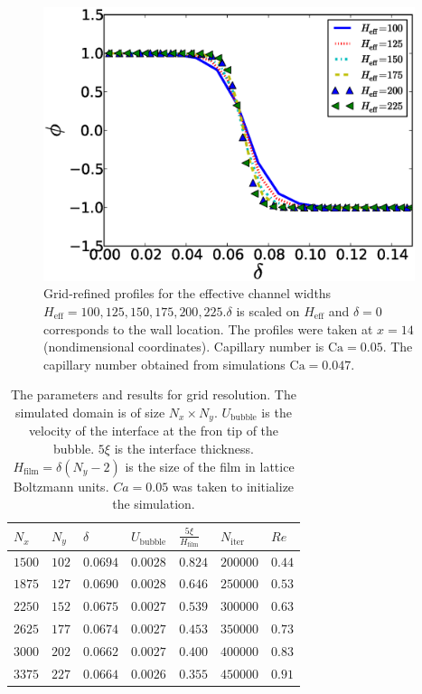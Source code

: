 \documentclass[preprint,12pt]{elsarticle}
\newcommand{\Ca}{\mathrm{Ca}}
\begin{document}
\begin{figure}
\includegraphics[width=0.97\textwidth]{Figures/Grid/norm_grid_profs.eps}
\caption{Grid-refined profiles for the effective
channel widths
$H_{\mathrm{eff}}=100,125,150,175,200,225$.$\delta$ is scaled on $H_{\mathrm{eff}}$ and $\delta=0$
corresponds to the wall location. The profiles were taken at $x=14$ (nondimensional coordinates).
Capillary number is $\Ca=0.05$. The capillary number obtained from simulations $\Ca=0.047$. 
\label{fig:grid:profiles}}
\end{figure}
\begin{table}
\begin{tabularx}{0.97\textwidth}{|X|X|X|X|X|X|X|}
\hline
$N_x$&$N_y$&$\delta$&$U_\mathrm{bubble}$&$\frac{5\xi}{H_{\mathrm{film}}}$&$N_\mathrm{iter}$&{
\color{red} $Re$}\\
\hline
$1500$&$102$&$0.0694$&$0.0028$&$0.824$&$200000$&$0.44$\\
\hline
$1875$&$127$&$0.0690$&$0.0028$&$0.646$&$250000$&$0.53$\\
\hline
$2250$&$152$&$0.0675$&$0.0027$&$0.539$&$300000$&$0.63$\\
\hline
$2625$&$177$&$0.0674$&$0.0027$&$0.453$&$350000$&$0.73$\\
\hline
$3000$&$202$&$0.0662$&$0.0027$&$0.400$&$400000$&$0.83$\\
\hline
$3375$&$227$&$0.0664$&$0.0026$&$0.355$&$450000$&$0.91$\\
\hline
\end{tabularx}
\caption{The parameters and results for grid resolution. The simulated domain is
of size $N_x \times N_y$. $U_\mathrm{bubble}$ is the velocity of the interface at the fron tip of
the bubble.  $5\xi$ is the interface thickness. $H_{\mathrm{film}}=\delta (N_y-2)$ is the size of
the film in
lattice Boltzmann units. $Ca=0.05$ was taken to initialize the simulation.
\label{table:parameters:grid:refinement}}
\end{table}
\end{document}
